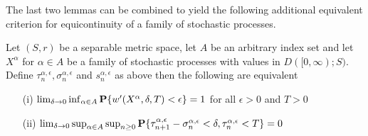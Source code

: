 The last two lemmas can be combined to yield the following additional equivalent criterion for equicontinuity of a family of stochastic processes.
\begin{prop}Let $(S,r)$ be a separable metric space, let $A$ be an arbitrary index set and let $X^\alpha$ for $\alpha \in A$ be a family of stochastic processes with values in $D([0,\infty); S)$.  Define $\tau^{\alpha, \epsilon}_n, \sigma^{\alpha, \epsilon}_n$ and $s^{\alpha, \epsilon}_n$ as above then the following are equivalent
\begin{itemize}
\item[(i)]$\lim_{\delta \to 0} \inf_{\alpha \in A} \textbf{P}\{w^{\prime}(X^\alpha, \delta, T) < \epsilon\} = 1$ for all $\epsilon > 0$ and $T > 0$
\item[(ii)]$\lim_{\delta \to 0} \sup_{\alpha \in A} \sup_{n \geq 0} \textbf{P}\{\tau^{\alpha, \epsilon}_{n+1} - \sigma^{\alpha, \epsilon}_n < \delta, \tau^{\alpha, \epsilon}_n < T\} = 0$ 
\end{itemize}
\end{prop}
